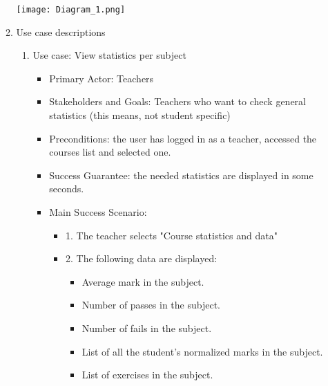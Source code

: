 \documentclass{article}
\begin{document}
\begin{enumerate}
\begin{enumerate}
		\texttt{[image: Diagram\_1.png]}
		\\
		\item{Use case descriptions}
		\begin{enumerate}
			\item{Use case: View statistics per subject}
			\begin{itemize}
				\item Primary Actor: Teachers
				\item Stakeholders and Goals: Teachers who want to check general statistics (this means, not student specific) 
				\item Preconditions: the user has logged in as a teacher, accessed the courses list and selected one.
				\item Success Guarantee: the needed statistics are displayed in some seconds.
				\item Main Success Scenario: 
					\begin{itemize}
					\item 1. The teacher selects "Course statistics and data"
					\item 2. The following data are displayed:
						\begin{itemize}
							\item Average mark in the subject.
							\item Number of passes in the subject.
							\item Number of fails in the subject.
							\item List of all the student's normalized marks in the subject.
							\item List of exercises in the subject.
						\end{itemize}
				

\end{itemize}
\end{itemize}
\end{enumerate}
\end{enumerate}
\end{enumerate}
\end{document}
